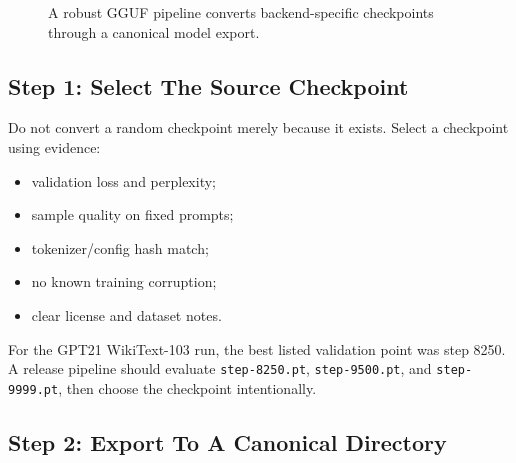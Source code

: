 \begin{figure}[htbp]
\centering
{}
\caption{A robust GGUF pipeline converts backend-specific checkpoints through a canonical model export.}
\end{figure}

\subsection{Step 1: Select The Source Checkpoint}

Do not convert a random checkpoint merely because it exists. Select a checkpoint using
evidence:

\begin{itemize}
  \item validation loss and perplexity;
  \item sample quality on fixed prompts;
  \item tokenizer/config hash match;
  \item no known training corruption;
  \item clear license and dataset notes.
\end{itemize}

For the GPT21 WikiText-103 run, the best listed validation point was step 8250. A release
pipeline should evaluate \texttt{step-8250.pt}, \texttt{step-9500.pt}, and
\texttt{step-9999.pt}, then choose the checkpoint intentionally.

\subsection{Step 2: Export To A Canonical Directory}

